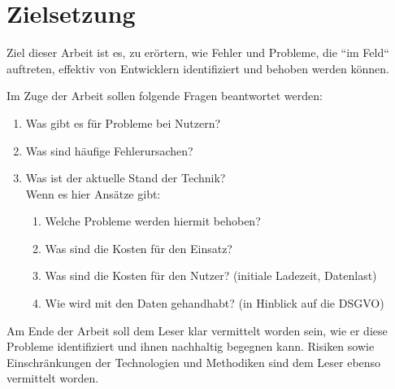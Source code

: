 \section{Zielsetzung}

Ziel dieser Arbeit ist es, zu erörtern, wie Fehler und Probleme, die ``im Feld`` auftreten, effektiv von Entwicklern identifiziert und behoben werden können.

Im Zuge der Arbeit sollen folgende Fragen beantwortet werden:

\begin{enumerate}
	\item Was gibt es für Probleme bei Nutzern?
	\item Was sind häufige Fehlerursachen?
	\item Was ist der aktuelle Stand der Technik? \\ 
	Wenn es hier Ansätze gibt:
	\begin{enumerate}
		\item Welche Probleme werden hiermit behoben?
		\item Was sind die Kosten für den Einsatz?
		\item Was sind die Kosten für den Nutzer? (initiale Ladezeit, Datenlast)
		\item Wie wird mit den Daten gehandhabt? (in Hinblick auf die DSGVO)
	\end{enumerate}
\end{enumerate}

Am Ende der Arbeit soll dem Leser klar vermittelt worden sein, wie er diese Probleme identifiziert und ihnen nachhaltig begegnen kann. Risiken sowie Einschränkungen der Technologien und Methodiken sind dem Leser ebenso vermittelt worden.

%

